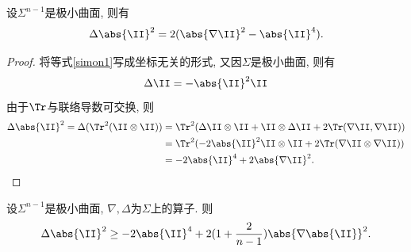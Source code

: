\begin{proposition}[Simons等式] \label{simon_equation}
    设$\Sigma^{n-1}$是极小曲面, 则有
    \begin{equation}
        \Delta\abs{\II}^2 = 2(\abs{\nabla \II}^2-\abs{\II}^4).
    \end{equation}
\end{proposition}
\begin{proof}
    将等式\eqref{simon1}写成坐标无关的形式, 又因$\Sigma$是极小曲面, 则有
    \begin{equation}
        \Delta \II = -\abs{\II}^2 \II
    \end{equation}
    由于$\Tr$与联络导数可交换, 则
    \begin{equation}
        \begin{split}
            \Delta \abs{\II}^2 = \Delta (\Tr^2(\II\otimes\II)) &= \Tr^2(\Delta \II \otimes\II + \II \otimes \Delta \II + 2 \Tr(\nabla \II, \nabla \II)) \\
            &=\Tr^2(-2\abs{\II}^2 \II\otimes\II+2\Tr(\nabla \II \otimes \nabla \II)) \\
            &=-2\abs{\II}^4+2\abs{\nabla \II}^2.
        \end{split}
    \end{equation}
\end{proof}
\begin{proposition}[Simons不等式]
    设$\Sigma^{n-1}$是极小曲面, $\nabla,\Delta$为$\Sigma$上的算子. 则
    \begin{equation} \label{simon_inequality}
        \Delta \abs{\II}^2 \ge -2\abs{\II}^4+2(1+\frac{2}{n-1})\abs{\nabla \abs{\II}}^2.
    \end{equation}
\end{proposition}
